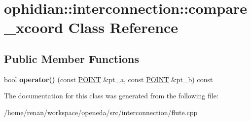 \hypertarget{classophidian_1_1interconnection_1_1compare__xcoord}{\section{ophidian\-:\-:interconnection\-:\-:compare\-\_\-xcoord Class Reference}
\label{classophidian_1_1interconnection_1_1compare__xcoord}
}
\subsection*{Public Member Functions}
\begin{DoxyCompactItemize}
\item 
\hypertarget{classophidian_1_1interconnection_1_1compare__xcoord_a4295d7e828549b5a74a62dd57f654820}{bool {\bfseries operator()} (const \hyperlink{structophidian_1_1interconnection_1_1point}{P\-O\-I\-N\-T} \&pt\-\_\-a, const \hyperlink{structophidian_1_1interconnection_1_1point}{P\-O\-I\-N\-T} \&pt\-\_\-b) const }\label{classophidian_1_1interconnection_1_1compare__xcoord_a4295d7e828549b5a74a62dd57f654820}

\end{DoxyCompactItemize}


The documentation for this class was generated from the following file\-:\begin{DoxyCompactItemize}
\item 
/home/renan/workspace/openeda/src/interconnection/flute.\-cpp\end{DoxyCompactItemize}
